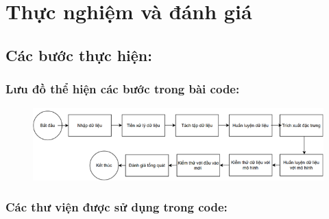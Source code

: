 \setlength{\headheight}{14.93912pt}  %
\addtolength{\topmargin}{-2.93912pt} %

\pagestyle{fancy} 

\fancyhf{}  %

\fancyfoot[C]{\thepage}  %

\chapter[Thực nghiệm và đánh giá]{\centering Thực nghiệm và đánh giá}

\section{Các bước thực hiện:}

\subsection{Lưu đồ thể hiện các bước trong bài code:}

\begin{figure}[h]
    \centering
    \includegraphics[width=1\textwidth]{img/docspics/02_progress.png}
\end{figure}

\subsection{Các thư viện được sử dụng trong code:}

